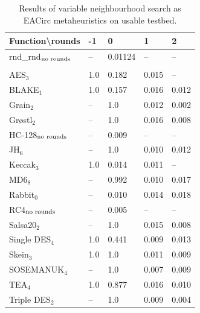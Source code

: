 \documentclass[
    digital,    %
    oneside,    %
    color,
    11pt,
    nocover,
    notable,
    nolof,
    nolot,
]{fithesis3}
\newcommand{\fd}{\cellcolor{myred!15}}
\newcommand{\fn}{\cellcolor{mygreen!20}}
\begin{document}
\begin{table}[H]
\centering
\begin{tabular}{l|l l l l}
\textbf{\large Function\textbackslash{}rounds} & \textbf{\large -1} & \textbf{\large 0} & \textbf{\large 1} & \textbf{\large 2}\\ \hline
rnd\_rnd$_{\textnormal{no rounds}}$ & -- & \fn{}0.01124 & -- & --   \\\\
AES$_{3}$        & \fd{}1.0   & \fd{}0.182 & \fn{}0.015 & \fn{}--   \\
BLAKE$_{1}$      & \fd{}1.0   & \fd{}0.157 & \fn{}0.016 & \fn{}0.012\\
Grain$_{2}$      & \fd{}--    & \fd{}1.0   & \fn{}0.012 & \fn{}0.002\\
Gr\o stl$_{2}$   & \fd{}--    & \fd{}1.0   & \fn{}0.016 & \fn{}0.008\\
HC-128$_{\textnormal{no rounds}}$& -- & \fn{}0.009 & -- & --        \\
JH$_{6}$         & \fd{}--    & \fd{}1.0   & \fn{}0.010 & \fn{}0.012\\
Keccak$_{3}$     & \fd{}1.0   & \fn{}0.014 & \fn{}0.011 & \fn{}--   \\
MD6$_{8}$        & \fd{}--    & \fd{}0.992 & \fn{}0.010 & \fn{}0.017\\
Rabbit$_{0}$     &      --    & \fn{}0.010 & \fn{}0.014 & \fn{}0.018\\
RC4$_{\textnormal{no rounds}}$& -- & \fn{}0.005 & --    & --        \\
Salsa20$_{2}$    & \fd{}--    & \fd{}1.0   & \fn{}0.015 & \fn{}0.008\\
Single DES$_{4}$ & \fd{}1.0   & \fd{}0.441 & \fn{}0.009 & \fn{}0.013\\
Skein$_{3}$      & \fd{}1.0   & \fd{}1.0   & \fn{}0.011 & \fn{}0.009\\
SOSEMANUK$_{4}$  & \fd{}--    & \fd{}1.0   & \fn{}0.007 & \fn{}0.009\\
TEA$_{4}$        & \fd{}1.0   & \fd{}0.877 & \fn{}0.016 & \fn{}0.010\\
Triple DES$_{2}$ & \fd{}--    & \fd{}1.0   & \fn{}0.009 & \fn{}0.004
\end{tabular}
\caption{Results of variable neighbourhood search as EACirc metaheuristics on usable testbed.}
\label{table:res-usable-vns}
\end{table}
\end{document}
